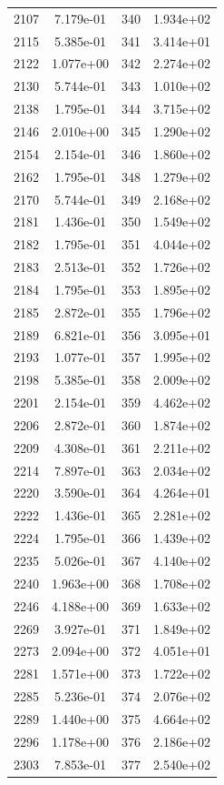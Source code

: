 \documentclass[12pt]{article}
\begin{document}
\begin{longtable}{@{}cccc@{}}
2107 & 7.179e-01 & 340 & 1.934e+02 \\
2115 & 5.385e-01 & 341 & 3.414e+01 \\
2122 & 1.077e+00 & 342 & 2.274e+02 \\
2130 & 5.744e-01 & 343 & 1.010e+02 \\
2138 & 1.795e-01 & 344 & 3.715e+02 \\
2146 & 2.010e+00 & 345 & 1.290e+02 \\
2154 & 2.154e-01 & 346 & 1.860e+02 \\
2162 & 1.795e-01 & 348 & 1.279e+02 \\
2170 & 5.744e-01 & 349 & 2.168e+02 \\
2181 & 1.436e-01 & 350 & 1.549e+02 \\
2182 & 1.795e-01 & 351 & 4.044e+02 \\
2183 & 2.513e-01 & 352 & 1.726e+02 \\
2184 & 1.795e-01 & 353 & 1.895e+02 \\
2185 & 2.872e-01 & 355 & 1.796e+02 \\
2189 & 6.821e-01 & 356 & 3.095e+01 \\
2193 & 1.077e-01 & 357 & 1.995e+02 \\
2198 & 5.385e-01 & 358 & 2.009e+02 \\
2201 & 2.154e-01 & 359 & 4.462e+02 \\
2206 & 2.872e-01 & 360 & 1.874e+02 \\
2209 & 4.308e-01 & 361 & 2.211e+02 \\
2214 & 7.897e-01 & 363 & 2.034e+02 \\
2220 & 3.590e-01 & 364 & 4.264e+01 \\
2222 & 1.436e-01 & 365 & 2.281e+02 \\
2224 & 1.795e-01 & 366 & 1.439e+02 \\
2235 & 5.026e-01 & 367 & 4.140e+02 \\
2240 & 1.963e+00 & 368 & 1.708e+02 \\
2246 & 4.188e+00 & 369 & 1.633e+02 \\
2269 & 3.927e-01 & 371 & 1.849e+02 \\
2273 & 2.094e+00 & 372 & 4.051e+01 \\
2281 & 1.571e+00 & 373 & 1.722e+02 \\
2285 & 5.236e-01 & 374 & 2.076e+02 \\
2289 & 1.440e+00 & 375 & 4.664e+02 \\
2296 & 1.178e+00 & 376 & 2.186e+02 \\
2303 & 7.853e-01 & 377 & 2.540e+02 \\

\end{longtable}
\end{document}
